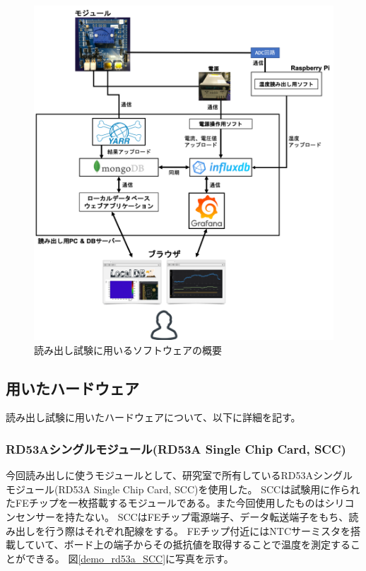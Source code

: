 \begin{figure}[bpt]\centering
\includegraphics[width=14cm]{readout_SW_overview}
\caption[読み出し試験に用いるソフトウェアの概要]{読み出し試験に用いるソフトウェアの概要}
\label{readout_SW_overview}
\end{figure}

\clearpage
\subsection{用いたハードウェア}
読み出し試験に用いたハードウェアについて、以下に詳細を記す。

\subsubsection{RD53Aシングルモジュール(RD53A Single Chip Card, SCC)}
今回読み出しに使うモジュールとして、研究室で所有しているRD53Aシングルモジュール(RD53A Single Chip Card, SCC)を使用した。
SCCは試験用に作られたFEチップを一枚搭載するモジュールである。また今回使用したものはシリコンセンサーを持たない。
SCCはFEチップ電源端子、データ転送端子をもち、読み出しを行う際はそれぞれ配線をする。
FEチップ付近にはNTCサーミスタを搭載していて、ボード上の端子からその抵抗値を取得することで温度を測定することができる。
図\ref{demo_rd53a_SCC}に写真を示す。

